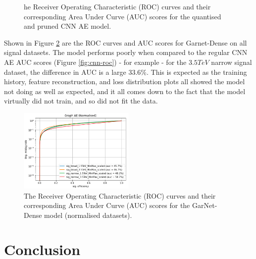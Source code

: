 \documentclass[a4paper]{article}
\theoremstyle{plain}
\theoremstyle{definition}
\begin{document}
\begin{figure}[H]
\begin{minipage}[c]{0.45\linewidth}
						\caption{he Receiver Operating Characteristic (ROC) curves and their corresponding Area Under Curve (AUC) scores for the quantised and pruned CNN AE model.}
						\label{fig:cnn-compressed-roc}
					\end{minipage}
			\end{figure}

			Shown in Figure \ref{fig:garnet-roc} are the ROC curves and AUC scores for Garnet-Dense on all signal datasets. The model performs poorly when compared to the regular CNN AE AUC scores (Figure \ref{fig:cnn-roc}) - for example - for the $3.5  TeV$ narrow signal dataset, the difference in AUC is a large 33.6\%. This is expected as the training history, feature reconstruction, and loss distribution plots all showed the model not doing as well as expected, and it all comes down to the fact that the model virtually did not train, and so did not fit the data. 

			\begin{figure}[H]
				\centering
				\begin{minipage}[b]{\linewidth}
					\centering
					\includegraphics[width=0.5\textwidth]{garnet-roc.png}
					\caption{The Receiver Operating Characteristic (ROC) curves and their corresponding Area Under Curve (AUC) scores for the GarNet-Dense model (normalised datasets).}
					\label{fig:garnet-roc}
				\end{minipage}
			\end{figure}


    \section{Conclusion}
    \label{section:conclusion}
\end{document}
